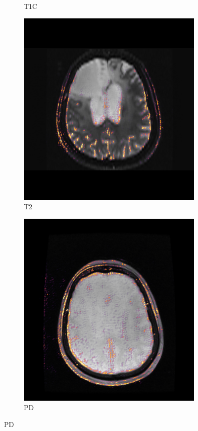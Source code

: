 \begin{figure}
\begin{subfigure}[t]{\figexamplewidth}
        \caption{\gls{T1C}}\label{fig:T1GDCam}
    \end{subfigure}
    \begin{subfigure}[t]{\figexamplewidth}
        \centering
        \includegraphics[width=\textwidth]{Figures/T2_saliency}
        \caption{\gls{T2}}\label{fig:T2wCam}
    \end{subfigure}
    \begin{subfigure}[t]{\figexamplewidth}
        \centering
        \includegraphics[width=\textwidth]{Figures/PD_saliency}
        \caption{\gls{PD}}\label{fig:PDwCam}
    \end{subfigure}



\end{figure}
